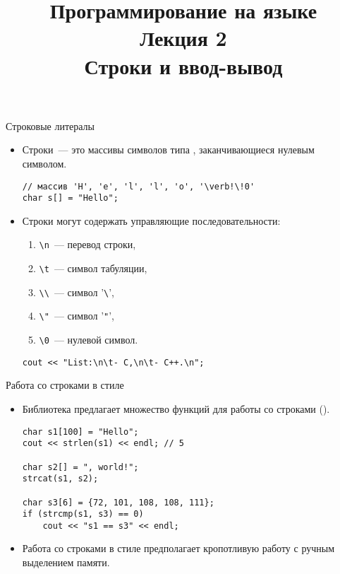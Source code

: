\documentclass{beamer}
\title{{\bf Программирование на языке \langcpp\protect\\Лекция
2\protect\vspace{1em}\\}Строки и ввод-вывод}
\begin{document}
\begin{frame} 
  \titlepage
\end{frame}

\begin{frame}[fragile]{Строковые литералы}
    \begin{itemize}
        \item Строки~--- это массивы символов
            типа , заканчивающиеся нулевым символом.
\begin{lstlisting}
// массив 'H', 'e', 'l', 'l', 'o', '\verb!\!0'
char s[] = "Hello";

\end{lstlisting}

        \item Строки могут содержать управляющие последовательности:
            \begin{enumerate}
                \item \verb!\n!~--- перевод строки,
                \item \verb!\t!~--- символ табуляции,
                \item \verb!\\!~--- символ '\verb!\!',
                \item \verb!\"!~--- символ '\verb!"!',
                \item \verb!\0!~--- нулевой символ.
            \end{enumerate}

\begin{lstlisting}
cout << "List:\n\t- C,\n\t- C++.\n";
\end{lstlisting}
    \end{itemize}
\end{frame}

\begin{frame}[fragile]{Работа со строками в стиле \langc}
    \begin{itemize}
        \item Библиотека  предлагает множество
            функций для работы со строками ().
\begin{lstlisting}
char s1[100] = "Hello";
cout << strlen(s1) << endl; // 5

char s2[] = ", world!";
strcat(s1, s2);
                               
char s3[6] = {72, 101, 108, 108, 111};
if (strcmp(s1, s3) == 0)
    cout << "s1 == s3" << endl;
\end{lstlisting}
        \item Работа со строками в стиле \langc предполагает
            кропотливую работу с ручным выделением памяти.
    \end{itemize}
\end{frame}
\end{document}
